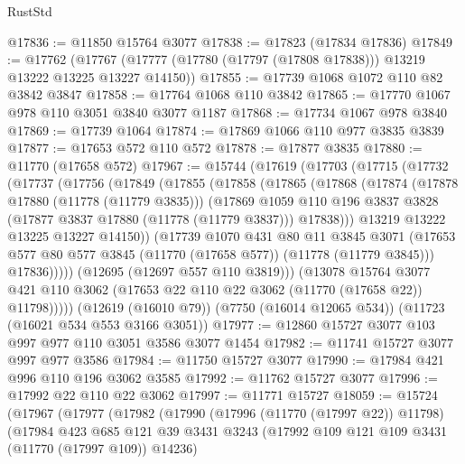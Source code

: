\begin{lexlean}{RustStd}
\begin{coremodule}
@17836 := @11850 @15764 @3077
@17838 := @17823 (@17834 @17836)
@17849 := @17762
    (@17767 (@17777 (@17780 (@17797 (@17808 @17838))) @13219 @13222 @13225 @13227 @14150))
@17855 := @17739 @1068 @1072 @110 @82 @3842 @3847
@17858 := @17764 @1068 @110 @3842
@17865 := @17770 @1067 @978 @110 @3051 @3840 @3077 @1187
@17868 := @17734 @1067 @978 @3840
@17869 := @17739 @1064
@17874 := @17869 @1066 @110 @977 @3835 @3839
@17877 := @17653 @572 @110 @572
@17878 := @17877 @3835
@17880 := @11770 (@17658 @572)
@17967 := @15744
    (@17619
      (@17703
        (@17715
          (@17732
            (@17737
              (@17756
                (@17849
                  (@17855
                    (@17858
                      (@17865
                        (@17868
                          (@17874
                            (@17878 @17880 (@11778 (@11779 @3835)))
                            (@17869
                              @1059
                              @110
                              @196
                              @3837
                              @3828
                              (@17877 @3837 @17880 (@11778 (@11779 @3837)))
                              @17838)))
                        @13219
                        @13222
                        @13225
                        @13227
                        @14150))
                    (@17739
                      @1070
                      @431
                      @80
                      @11
                      @3845
                      @3071
                      (@17653 @577 @80 @577 @3845 (@11770 (@17658 @577)) (@11778 (@11779 @3845)))
                      @17836)))))
            (@12695 (@12697 @557 @110 @3819)))
          (@13078
            @15764
            @3077
            @421
            @110
            @3062
            (@17653 @22 @110 @22 @3062 (@11770 (@17658 @22)) @11798)))))
    (@12619 (@16010 @79))
    (@7750 (@16014 @12065 @534))
    (@11723 (@16021 @534 @553 @3166 @3051))
@17977 := @12860 @15727 @3077 @103 @997 @977 @110 @3051 @3586 @3077 @1454
@17982 := @11741 @15727 @3077 @997 @977 @3586
@17984 := @11750 @15727 @3077
@17990 := @17984 @421 @996 @110 @196 @3062 @3585
@17992 := @11762 @15727 @3077
@17996 := @17992 @22 @110 @22 @3062
@17997 := @11771 @15727
@18059 := @15724
    (@17967
      (@17977
        (@17982
          (@17990
            (@17996 (@11770 (@17997 @22)) @11798)
            (@17984
              @423
              @685
              @121
              @39
              @3431
              @3243
              (@17992 @109 @121 @109 @3431 (@11770 (@17997 @109)) @14236)

\end{coremodule}
\end{lexlean}
